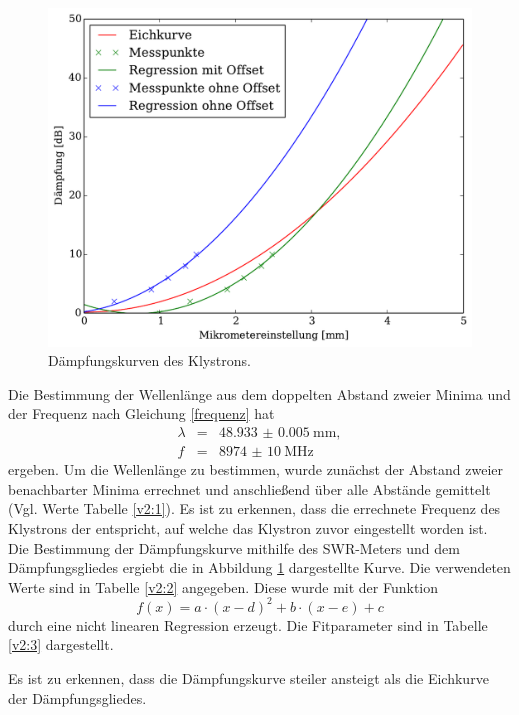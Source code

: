 \begin{figure}
	\includegraphics[width = 14cm]{pic/Daempfung.pdf}
	\caption[]{Dämpfungskurven des Klystrons.}
	\label{daempf}
\end{figure}

Die Bestimmung der Wellenlänge aus dem doppelten Abstand zweier Minima und der Frequenz nach Gleichung \eqref{frequenz} hat
\begin{eqnarray}
	\lambda &=& \SI{48.933(5)}{\milli\meter},\\
	f &=& \SI{8974(10)}{\mega\hertz}
\end{eqnarray}
ergeben.
Um die Wellenlänge zu bestimmen, wurde zunächst der Abstand zweier benachbarter Minima errechnet und anschließend über alle Abstände gemittelt (Vgl. Werte Tabelle \ref{v2:1}).
Es ist zu erkennen, dass die errechnete Frequenz des Klystrons der entspricht, auf welche das Klystron zuvor eingestellt worden ist.\\

Die Bestimmung der Dämpfungskurve mithilfe des SWR-Meters und dem Dämpfungsgliedes ergiebt die in Abbildung \ref{daempf} dargestellte Kurve.
Die verwendeten Werte sind in Tabelle \ref{v2:2} angegeben.
Diese wurde mit der Funktion
\begin{equation}
	f(x)=a \cdot (x-d)^2 + b \cdot (x-e) + c
\end{equation}
durch eine nicht linearen Regression erzeugt.
Die Fitparameter sind in Tabelle \ref{v2:3} dargestellt.

Es ist zu erkennen, dass die Dämpfungskurve steiler ansteigt als die Eichkurve der Dämpfungsgliedes.

